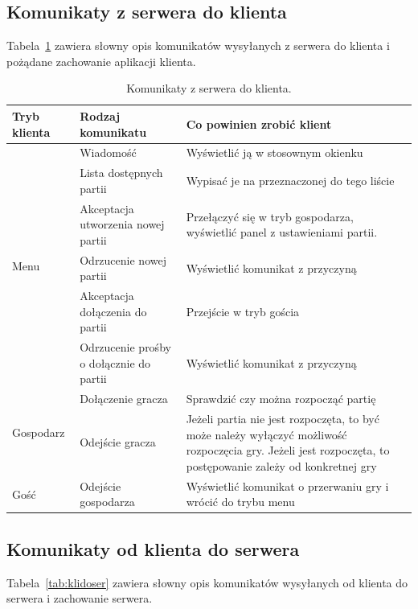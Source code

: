 \documentclass[a4paper, 12pt]{article}
\begin{document}
\subsection{Komunikaty z serwera do klienta}
Tabela~\ref{tab:serdokli} zawiera słowny opis komunikatów wysyłanych z serwera do klienta i pożądane zachowanie aplikacji klienta. 
\begin{table}
\caption{Komunikaty z serwera do klienta.}
\begin{center}
 \begin{tabular}{p{2cm}||p{5.2cm}||p{7cm}}
 \hbox{Tryb} klienta& Rodzaj komunikatu & Co powinien zrobić klient\\ \hline \hline
\multirow{6}{*}{Menu}
  & Wiadomość
  & Wyświetlić ją w stosownym okienku \\ \cline{2-3}

  & Lista dostępnych partii
  & Wypisać je na przeznaczonej do tego liście \\ \cline{2-3}

  & Akceptacja utworzenia nowej partii
  & Przełączyć się w tryb gospodarza, wyświetlić panel z ustawieniami partii. \\ \cline{2-3}

  & Odrzucenie nowej partii
  & Wyświetlić komunikat z przyczyną \\ \cline{2-3}

  & Akceptacja dołączenia do partii 
  & Przejście w tryb gościa \\ \cline{2-3}

  & Odrzucenie prośby o dołącznie do partii
  & Wyświetlić komunikat z przyczyną \\ \hline \hline

\multirow{2}{*}{Gospodarz}
  & Dołączenie gracza
  & Sprawdzić czy można rozpocząć partię \\ \cline{2-3}

  & Odejście gracza
  & Jeżeli partia nie jest rozpoczęta, to być może należy wyłączyć możliwość rozpoczęcia gry. Jeżeli jest rozpoczęta, to postępowanie zależy od konkretnej gry \\ \hline \hline

  Gość
  & Odejście gospodarza
  & Wyświetlić komunikat o przerwaniu gry i wrócić do trybu menu \\ \hline \hline
\end{tabular}
\label{tab:serdokli}
\end{center}
\end{table}

\subsection{Komunikaty od klienta do serwera}
Tabela~\ref{tab:klidoser} zawiera słowny opis komunikatów wysyłanych od klienta do serwera i zachowanie serwera.
\end{document}
